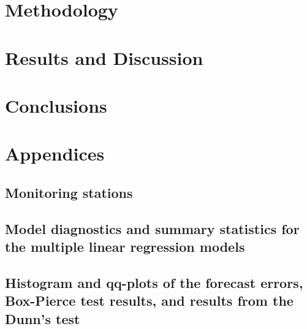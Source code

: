\documentclass[12pt]{report}
\numberwithin{equation}{section}
\begin{document}
\chapter{Methodology}


\chapter{Results and Discussion}


\chapter{Conclusions}


{}

%

%
\chapter*{Appendices}
\setcounter{section}{0}
\renewcommand\thesection{\Alph{section}}

\section{Monitoring stations}

\section{Model diagnostics and summary statistics for the multiple linear regression models}

\section{Histogram and qq-plots of the forecast errors, Box-Pierce test results, and results from the Dunn's test}

\end{document}
